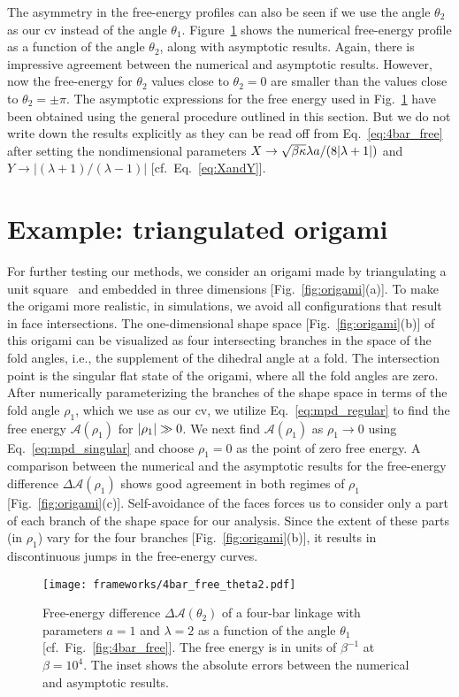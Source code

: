 The asymmetry in the free-energy profiles can also be seen if we use the angle $\theta_{2}$ as our \ac{cv} instead of the angle $\theta_{1}$.
Figure~\ref{fig:4bar_q2} shows the numerical free-energy profile as a function of the angle $\theta_{2}$, along with asymptotic results.
Again, there is impressive agreement between the numerical and asymptotic results.
However, now the free-energy for $\theta_{2}$ values close to $\theta_{2} = 0$ are smaller than the values close to $\theta_{2} = \pm\pi$.
The asymptotic expressions for the free energy used in Fig.~\ref{fig:4bar_q2} have been obtained using the general procedure outlined in this section.
But we do not write down the results explicitly as they can be read off from Eq.~\eqref{eq:4bar_free} after setting the nondimensional parameters $X \to \sqrt{\beta\kappa}\lambda a/(8\lvert\lambda+1\rvert)$ and $Y \to \left|(\lambda+1)/(\lambda-1)\right|$ [cf.~Eq.~\eqref{eq:XandY}].


\section{Example: triangulated origami}
\label{sec:origami}

For further testing our methods, we consider an origami made by triangulating a unit square~\cite{chen2018} and embedded in three dimensions [Fig.~\ref{fig:origami}(a)].
To make the origami more realistic, in simulations, we avoid all configurations that result in face intersections.
The one-dimensional shape space [Fig.~\ref{fig:origami}(b)] of this origami can be visualized as four intersecting branches in the space of the fold angles, i.e., the supplement of the dihedral angle at a fold.
The intersection point is the singular flat state of the origami, where all the fold angles are zero.
After numerically parameterizing the branches of the shape space in terms of the fold angle $\rho_{1}$, which we use as our \ac{cv}, we utilize Eq.~\eqref{eq:mpd_regular} to find the free energy $\mathscr{A}(\rho_{1})$ for $\lvert\rho_{1}\rvert \gg 0$.
We next find $\mathscr{A}(\rho_{1})$ as $\rho_{1} \to 0$ using Eq.~\eqref{eq:mpd_singular} and choose $\rho_{1}=0$ as the point of zero free energy.
A comparison between the numerical and the asymptotic results for the free-energy difference  $\Delta\mathscr{A}(\rho_{1})$ shows good agreement in both regimes of $\rho_{1}$ [Fig.~\ref{fig:origami}(c)].
Self-avoidance of the faces forces us to consider only a part of each branch of the shape space for our analysis.
Since the extent of these parts (in $\rho_{1}$) vary for the four branches [Fig.~\ref{fig:origami}(b)], it results in discontinuous jumps in the free-energy curves.
%
\begin{figure}
  \begin{center}
    \texttt{[image: frameworks/4bar\_free\_theta2.pdf]}
  \end{center}
  \caption{Free-energy difference $\Delta\mathscr{A}(\theta_2)$ of a four-bar linkage with parameters $a=1$ and $\lambda=2$ as a function of the angle $\theta_{1}$ [cf.~Fig.~\ref{fig:4bar_free}].
  The free energy is in units of $\beta^{-1}$ at $\beta = 10^{4}$.
  The inset shows the absolute errors between the numerical and asymptotic results.
  \label{fig:4bar_q2}
}
\end{figure}


